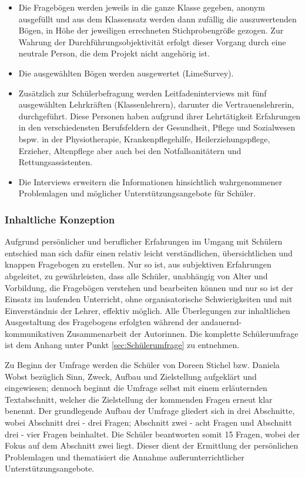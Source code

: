 \begin{itemize}
	\item Die Fragebögen werden jeweils in die ganze Klasse gegeben, anonym ausgefüllt und aus dem Klassensatz werden dann zufällig die auszuwertenden Bögen, in Höhe der jeweiligen errechneten Stichprobengröße gezogen. Zur Wahrung der Durchführungsobjektivität erfolgt dieser Vorgang durch eine neutrale Person, die dem Projekt nicht angehörig ist. 
	\item Die ausgewählten Bögen werden ausgewertet (LimeSurvey).
	\item Zusätzlich zur Schülerbefragung werden Leitfadeninterviews mit fünf ausgewählten Lehrkräften (Klassenlehrern), darunter die Vertrauenslehrerin, durchgeführt. Diese Personen haben aufgrund ihrer Lehrtätigkeit Erfahrungen in den verschiedensten Berufsfeldern der Gesundheit, Pflege und Sozialwesen bspw. in der Physiotherapie, Krankenpflegehilfe, Heilerziehungspflege, Erzieher, Altenpflege aber auch bei den Notfallsanitätern und Rettungsassistenten.
	\item Die Interviews erweitern die Informationen hinsichtlich wahrgenommener Problemlagen und möglicher Unterstützungsangebote für Schüler.
\end{itemize}

\subsubsection{Inhaltliche Konzeption}
\label{sec:InhaltlicheKonzeption}

Aufgrund persönlicher und beruflicher Erfahrungen im Umgang mit Schülern entschied man sich dafür einen relativ leicht verständlichen, übersichtlichen und knappen Fragebogen zu erstellen. Nur so ist, aus subjektiven Erfahrungen abgeleitet, zu gewährleisten, dass alle Schüler, unabhängig von Alter und Vorbildung, die Fragebögen verstehen und bearbeiten können und nur so ist der Einsatz im laufenden Unterricht, ohne organisatorische Schwierigkeiten und mit Einverständnis der Lehrer, effektiv möglich. Alle Überlegungen zur inhaltlichen Ausgestaltung des Fragebogens erfolgten während der andauernd-kommunikativen Zusammenarbeit der Autorinnen. Die komplette Schülerumfrage ist dem Anhang unter Punkt \ref{sec:Schülerumfrage} zu entnehmen.

Zu Beginn der Umfrage werden die Schüler von Doreen Stichel bzw. Daniela Wobst bezüglich Sinn, Zweck, Aufbau und Zielstellung aufgeklärt und eingewiesen; dennoch beginnt die Umfrage selbst mit einem erläuternden Textabschnitt, welcher die Zielstellung der kommenden Fragen erneut klar benennt. Der grundlegende Aufbau der Umfrage gliedert sich in drei Abschnitte, wobei Abschnitt drei - drei Fragen; Abschnitt zwei - acht Fragen und Abschnitt drei - vier Fragen beinhaltet. Die Schüler beantworten somit 15 Fragen, wobei der Fokus auf dem Abschnitt zwei liegt. Dieser dient der Ermittlung der persönlichen Problemlagen und thematisiert die Annahme außerunterrichtlicher Unterstützungsangebote. 

